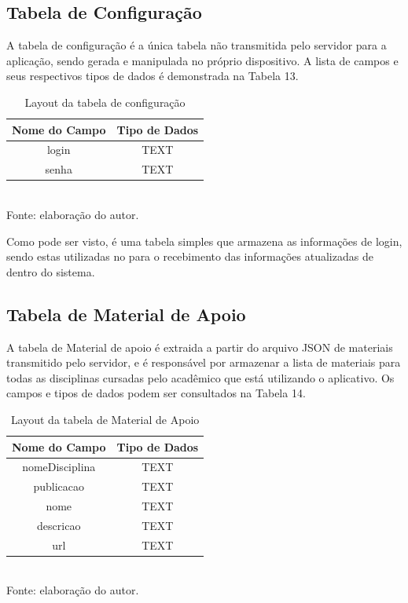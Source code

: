 \subsection{Tabela de Configuração}
A tabela de configuração é a única tabela não transmitida pelo servidor para a aplicação, sendo gerada e manipulada no próprio dispositivo. A lista de campos e seus respectivos tipos de dados é demonstrada na Tabela 13.

\begin{table}[!hbt]
\centering
\caption[Aplicação - Tabela de Configuração]{Layout da tabela de configuração}
\vspace{3mm}
\begin{tabular}{c|c}\hline
\textbf{Nome do Campo} & \textbf{Tipo de Dados} \\ \hline
login & TEXT \\ \hline
senha & TEXT \\ \hline
\end{tabular}
\\ Fonte: elaboração do autor.
\end{table}

Como pode ser visto, é uma tabela simples que armazena as informações de login, sendo estas utilizadas no para o recebimento das informações atualizadas de dentro do sistema.

\subsection{Tabela de Material de Apoio}
A tabela de Material de apoio é extraida a partir do arquivo JSON de materiais transmitido pelo servidor, e é responsável por armazenar a lista de materiais para todas as disciplinas cursadas pelo acadêmico que está utilizando o aplicativo. Os campos e tipos de dados podem ser consultados na Tabela 14.

\begin{table}[!hbt]
\centering
\caption[Aplicação - Tabela de Material de Apoio]{Layout da tabela de Material de Apoio}
\vspace{3mm}
\begin{tabular}{c|c}\hline
\textbf{Nome do Campo} & \textbf{Tipo de Dados} \\ \hline
nomeDisciplina         & TEXT                   \\ \hline
publicacao             & TEXT                   \\ \hline 
nome                   & TEXT                   \\ \hline
descricao              & TEXT                   \\ \hline
url                    & TEXT                   \\ \hline
\end{tabular}
\\ Fonte: elaboração do autor.
\end{table}

